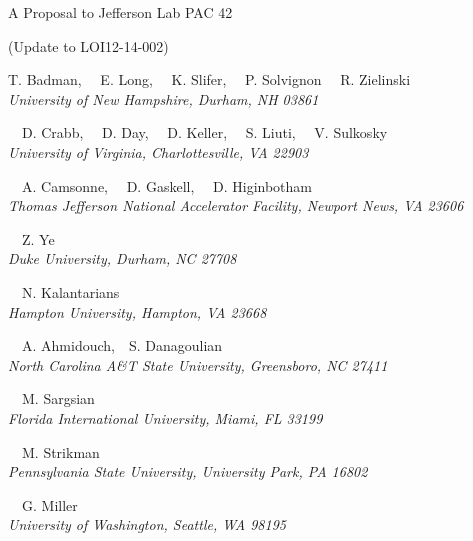 \begin{center}
A Proposal to Jefferson Lab PAC 42

(Update to LOI12-14-002)

\vspace{1.5cm}

\setcounter{footnote}{\SPOKES}
%
{T. Badman,
~~E. Long,\setcounter{footnote}{\SPOKES}
\setcounter{footnote}{\SPOKES}\footnotemark {}
\setcounter{footnote}{\CONTACT}\footnotemark{}
~~K. Slifer,\setcounter{footnote}{\SPOKES}\footnotemark
~~P. Solvignon\setcounter{footnote}{\SPOKES}\footnotemark
~~R. Zielinski
}\\
\ls
{\normalsize\it{University of New Hampshire, Durham, NH 03861}}

\vspace{10px}

{~~D. Crabb,
~~D. Day,\setcounter{footnote}{\SPOKES}\footnotemark
~~D. Keller,\setcounter{footnote}{\SPOKES}\footnotemark
~~S. Liuti,
~~V. Sulkosky}\\
\ls
{\normalsize\it{University of Virginia, Charlottesville, VA 22903}}

\vspace{10px}

{~~A. Camsonne,
~~D. Gaskell,
~~D. Higinbotham\setcounter{footnote}{\SPOKES}\footnotemark}\\
\ls
{\normalsize\it{Thomas Jefferson National Accelerator Facility, Newport News, VA 23606}}

\vspace{10px}

{~~Z. Ye}\\
\ls
{\normalsize\it{Duke University, Durham, NC 27708}}

\vspace{10px}

{~~N. Kalantarians}\\
\ls
{\normalsize\it{Hampton University, Hampton, VA 23668}}

\vspace{10px}

{~~A. Ahmidouch,~~S. Danagoulian}\\
\ls
{\normalsize\it{North Carolina A\&T State University, Greensboro, NC 27411}}

\vspace{10px}

{~~M. Sargsian}\\
\ls
{\normalsize\it{Florida International University, Miami, FL 33199}}

\vspace{10px}

{~~M. Strikman}\\
\ls
{\normalsize\it{Pennsylvania State University, University Park, PA 16802}}

\vspace{10px}

{~~G. Miller}\\
\ls
{\normalsize\it{University of Washington, Seattle, WA 98195}}
\ks
%

\end{center}


\setcounter{footnote}{0}
